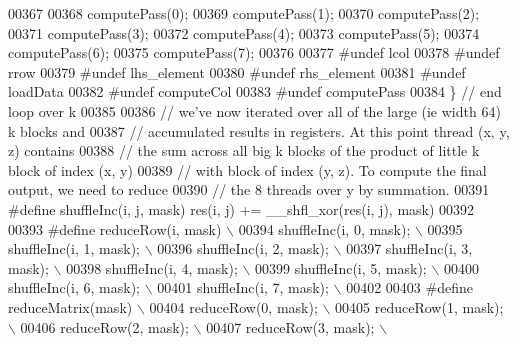 \begin{DoxyCode}
00367 \textcolor{preprocessor}{}
00368     computePass(0);
00369     computePass(1);
00370     computePass(2);
00371     computePass(3);
00372     computePass(4);
00373     computePass(5);
00374     computePass(6);
00375     computePass(7);
00376 
00377 \textcolor{preprocessor}{#undef lcol}
00378 \textcolor{preprocessor}{#undef rrow}
00379 \textcolor{preprocessor}{#undef lhs\_element}
00380 \textcolor{preprocessor}{#undef rhs\_element}
00381 \textcolor{preprocessor}{#undef loadData}
00382 \textcolor{preprocessor}{#undef computeCol}
00383 \textcolor{preprocessor}{#undef computePass}
00384   \} \textcolor{comment}{// end loop over k}
00385 
00386   \textcolor{comment}{// we've now iterated over all of the large (ie width 64) k blocks and}
00387   \textcolor{comment}{// accumulated results in registers. At this point thread (x, y, z) contains}
00388   \textcolor{comment}{// the sum across all big k blocks of the product of little k block of index (x, y)}
00389   \textcolor{comment}{// with block of index (y, z). To compute the final output, we need to reduce}
00390   \textcolor{comment}{// the 8 threads over y by summation.}
00391 \textcolor{preprocessor}{#define shuffleInc(i, j, mask) res(i, j) += \_\_shfl\_xor(res(i, j), mask)}
00392 
00393 \textcolor{preprocessor}{#define reduceRow(i, mask)                      \(\backslash\)}
00394 \textcolor{preprocessor}{  shuffleInc(i, 0, mask);                       \(\backslash\)}
00395 \textcolor{preprocessor}{  shuffleInc(i, 1, mask);                       \(\backslash\)}
00396 \textcolor{preprocessor}{  shuffleInc(i, 2, mask);                       \(\backslash\)}
00397 \textcolor{preprocessor}{  shuffleInc(i, 3, mask);                       \(\backslash\)}
00398 \textcolor{preprocessor}{  shuffleInc(i, 4, mask);                       \(\backslash\)}
00399 \textcolor{preprocessor}{  shuffleInc(i, 5, mask);                       \(\backslash\)}
00400 \textcolor{preprocessor}{  shuffleInc(i, 6, mask);                       \(\backslash\)}
00401 \textcolor{preprocessor}{  shuffleInc(i, 7, mask);                       \(\backslash\)}
00402 \textcolor{preprocessor}{}
00403 \textcolor{preprocessor}{#define reduceMatrix(mask)                      \(\backslash\)}
00404 \textcolor{preprocessor}{  reduceRow(0, mask);                           \(\backslash\)}
00405 \textcolor{preprocessor}{  reduceRow(1, mask);                           \(\backslash\)}
00406 \textcolor{preprocessor}{  reduceRow(2, mask);                           \(\backslash\)}
00407 \textcolor{preprocessor}{  reduceRow(3, mask);                           \(\backslash\)}

\end{DoxyCode}
